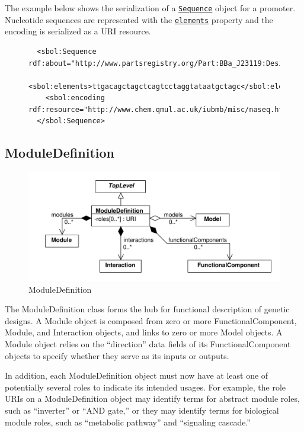 \documentclass[draftspec]{sbmlpkgspec}
\newcommand{\lstsetsbol}{
 \lstset{language=sbol,
        tabsize=2
 }
}
\newcommand{\sbol}[1]{\texttt{\hyperref[sec:#1]{#1}}}
\begin{document}
The example below shows the serialization of a \sbol{Sequence} object for a promoter. Nucleotide sequences are represented with the \sbol{elements} property and the encoding is serialized as a URI resource. 

\begin{figure} [ht]
\lstsetsbol
\begin{lstlisting}
  <sbol:Sequence rdf:about="http://www.partsregistry.org/Part:BBa_J23119:Design">
    <sbol:elements>ttgacagctagctcagtcctaggtataatgctagc</sbol:elements>
    <sbol:encoding rdf:resource="http://www.chem.qmul.ac.uk/iubmb/misc/naseq.html"/>
  </sbol:Sequence>
\end{lstlisting}
\label{ser:sequence}
\end{figure}


\subsection{ModuleDefinition}
\label{sec:ModuleDefinition}

\begin{figure}[ht]
\begin{center}
\includegraphics[scale=0.6]{uml/module_definition}
\caption[]{ModuleDefinition}
\label{uml:module_definition}
\end{center}
\end{figure}

The ModuleDefinition class forms the hub for functional description of genetic designs. A Module object is composed from zero or more FunctionalComponent, Module, and Interaction objects, and links to zero or more Model objects. A Module object relies on the “direction” data fields of its FunctionalComponent objects to specify whether they serve as its inputs or outputs.

In addition, each ModuleDefinition object must now have at least one of potentially several roles to indicate its intended usages. For example, the role URIs on a ModuleDefinition object may identify terms for abstract module roles, such as “inverter” or “AND gate,” or they may identify terms for biological module roles, such as “metabolic pathway” and “signaling cascade.”
\end{document}
